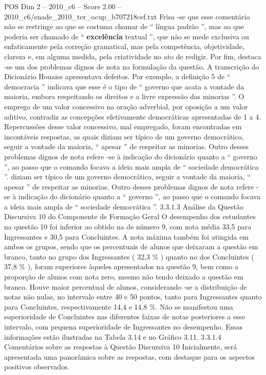 \begin{textsample}{POS Dim 2 – 2010\_c6 – Score 2.00 – 2010\_c6/enade\_2010\_ter\_ocup\_b707218cef.txt}
Frisa -se que esse comentário não se restringe ao que se costuma chamar de “ língua padrão ”, mas ao que poderia ser chamado de “ \textbf{excelência} textual ”, que não se mede exclusiva ou enfaticamente pela correção gramatical, mas pela competência, objetividade, clareza e, em alguma medida, pela criatividade no ato de redigir.
Por fim, destaca -se um dos problemas dignos de nota na formulação da questão.
A transcrição do Dicionário Houaiss apresentava defeitos.
Por exemplo, a definição 5 de “ democracia ” indicava que esse é o tipo de “ governo que acata a vontade da maioria, embora respeitando os direitos e a livre expressão das minorias ”.
O emprego de um valor concessivo na oração adverbial, por oposição a um valor aditivo, contradiz as concepções efetivamente democráticas apresentadas de 1 a 4.
Repercussões desse valor concessivo, mal empregado, foram encontradas em incontáveis respostas, as quais diziam ser típico de um governo democrático, seguir a vontade da maioria, “ apesar ” de respeitar as minorias.
Outro desses problemas dignos de nota refere -se à indicação do dicionário quanto a “ governo ”, ao passo que o comando focava a ideia mais ampla de “ sociedade democrática ”. diziam ser típico de um governo democrático, seguir a vontade da maioria, “ apesar ” de respeitar as minorias.
Outro desses problemas dignos de nota refere -se à indicação do dicionário quanto a “ governo ”, ao passo que o comando focava a ideia mais ampla de “ sociedade democrática ”. 3.3.1.3 Análise da Questão Discursiva 10 do Componente de Formação Geral O desempenho dos estudantes na questão 10 foi inferior ao obtido na de número 9, com nota média 33,5 para Ingressantes e 30,5 para Concluintes.
A nota máxima também foi atingida em ambos os grupos, sendo que os percentuais de alunos que deixaram a questão em branco, tanto no grupo dos Ingressantes ( 32,3 \% ) quanto no dos Concluintes ( 37,8 \% ), foram superiores àqueles apresentados na questão 9, bem como a proporção de alunos com nota zero, mesmo não tendo deixado a questão em branco.
Houve maior percentual de alunos, considerando -se a distribuição de notas não nulas, no intervalo entre 40 e 50 pontos, tanto para Ingressantes quanto para Concluintes, respectivamente 14,4 e 14,8 \%.
Não se manifestou uma superioridade de Concluintes nas diferentes faixas de notas posteriores a esse intervalo, com pequena superioridade de Ingressantes no desempenho.
Essas informações estão ilustradas na Tabela 3.14 e no Gráfico 3.11. 3.3.1.4 Comentários sobre as respostas à Questão Discursiva 10 Inicialmente, será apresentada uma panorâmica sobre as respostas, com destaque para os aspectos positivos observados.

\end{textsample}
